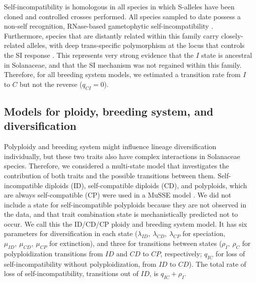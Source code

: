 Self-incompatibility is homologous in all species in which S-alleles have been cloned and controlled crosses performed.
All species sampled to date possess a non-self recognition, RNase-based gametophytic self-incompatibility \citep[shared even with other euasterid families;][]{ramanauskas_2017}.
Furthermore, species that are distantly related within this family carry closely-related alleles, with deep trans-specific polymorphism at the locus that controls the SI response \citep{ioerger_1990, igic_2006}.
This represents very strong evidence that the $I$ state is ancestral in Solanaceae, and that the SI mechanism was not regained within this family.
Therefore, for all breeding system models, we estimated a transition rate from $I$ to $C$  but not the reverse ($q_{CI}=0$).
%

\subsection{Models for ploidy, breeding system, and diversification}

Polyploidy and breeding system might influence lineage diversification individually, but these two traits also have complex interactions in Solanaceae species.
Therefore, we considered a multi-state model that investigates the contribution of both traits and the possible transitions between them.
Self-incompatible diploids (ID), self-compatible diploids (CD), and polyploids, which are always self-compatible (CP) were used in a MuSSE model \citep{fitzjohn_2012}.
We did not include a state for self-incompatible polyploids because they are not observed in the data, and  that trait combination state is mechanistically predicted not to occur.
We call this the ID/CD/CP ploidy and breeding system model.
It has six parameters for diversification in each state ($\lambda_{ID},\ \lambda_{CD},\ \lambda_{CP}$ for speciation, $\mu_{ID},\ \mu_{CD},\ \mu_{CP}$ for extinction), and three for transitions between states ($\rho_I,\ \rho_C$ for polyploidization transitions from $ID$ and $CD$ to $CP$, respectively; $q_{IC}$ for loss of self-incompatibility without polyploidization, from $ID$ to $CD$).
The total rate of loss of self-incompatibility, \ie transitions out of $ID$, is $q_{IC} + \rho_I$.

